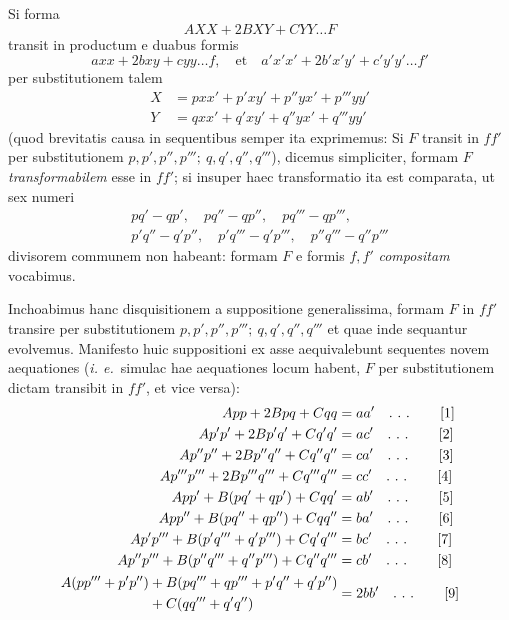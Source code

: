 Si forma
\[
AXX+2BXY+CYY\ldots F
\]
transit in productum e duabus formis
\[
axx+2bxy+cyy\ldots f,\quad\text{et}\quad a'x'x'+2b'x'y'+c'y'y'\ldots f'
\]
per substitutionem talem
\[
\begin{aligned}
X&=pxx'+p'xy'+p''yx'+p'''yy'\\
Y&=qxx'+q'xy'+q''yx'+q'''yy'
\end{aligned}
\]
(quod brevitatis causa in sequentibus semper ita exprimemus: Si $F$ transit in $ff'$ per substitutionem $p,p',p'',p''';\ q,q',q'',q'''$), dicemus simpliciter, formam $F$ \textit{transformabilem} esse in $ff'$; si insuper haec transformatio ita est comparata, ut sex numeri
\[
\begin{gathered}pq'-qp',\quad pq''-qp'',\quad pq'''-qp''',\\p'q''-q'p'',\quad p'q'''-q'p''',\quad p''q'''-q''p'''\end{gathered}
\]
divisorem communem non habeant: formam $F$ e formis $f,f'$ \textit{compositam} vocabimus.

Inchoabimus hanc disquisitionem a suppositione generalissima, formam $F$ in $ff'$ transire per substitutionem $p,p',p'',p''';\ q,q',q'',q'''$ et quae inde sequantur evolvemus. Manifesto huic suppositioni ex asse aequivalebunt sequentes novem aequationes (\textit{i. e.}\ simulac hae aequationes locum habent, $F$ per substitutionem dictam transibit in $ff'$, et vice versa):
\begin{align*}
App+2Bpq+Cqq&=aa'\quad\ldotp\,\ldotp\,\ldotp\tag*{[1]}\\
Ap'p'+2Bp'q'+Cq'q'&=ac'\quad\ldotp\,\ldotp\,\ldotp\tag*{[2]}\\
Ap''p''+2Bp''q''+Cq''q''&=ca'\quad\ldotp\,\ldotp\,\ldotp\tag*{[3]}\\
Ap'''p'''+2Bp'''q'''+Cq'''q'''&=cc'\quad\ldotp\,\ldotp\,\ldotp\tag*{[4]}\\
App'+B(pq'+qp')+Cqq'&=ab'\quad\ldotp\,\ldotp\,\ldotp\tag*{[5]}\\
App''+B(pq''+qp'')+Cqq''&=ba'\quad\ldotp\,\ldotp\,\ldotp\tag*{[6]}\\
Ap'p'''+B(p'q'''+q'p''')+Cq'q'''&=bc'\quad\ldotp\,\ldotp\,\ldotp\tag*{[7]}\\
Ap''p'''+B(p''q'''+q''p''')+Cq''q'''&=cb'\quad\ldotp\,\ldotp\,\ldotp\tag*{[8]}\\
\begin{aligned}A(pp'''+p'p'')&+B(pq'''+qp'''+p'q''+q'p'')\\&+C(qq'''+q'q'')\end{aligned}&=2bb'\quad\ldotp\,\ldotp\,\ldotp\tag*{[9]}
\end{align*}

